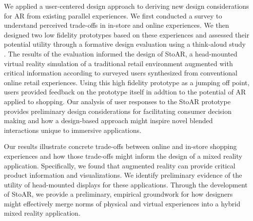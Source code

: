We applied  a user-centered design approach to deriving new design considerations for AR from existing parallel experiences. We first conducted a survey to understand perceived trade-offs in in-store and online experiences.  We then designed two low fidelity prototypes based on these experiences and assessed their potential utility through a formative design evaluation using a think-aloud study . The results of the evaluation informed the design of StoAR, a head-mounted virtual reality simulation of a traditional retail environment augmented with critical information according to surveyed users synthesized from conventional online retail experiences. Using this high fidelity prototype as a jumping off point, users provided feedback on the prototype itself in addtion to the potential of AR applied to shopping. Our analysis of user responses to the StoAR prototype provides preliminary design considerations for facilitating consumer decision making and how a design-based approach might inspire novel blended interactions unique to immersive applications.

Our results illustrate concrete trade-offs between online and in-store shopping experiences and how those trade-offs might inform the design of a mixed reality application. Specifically, we found that augmented reality can provide critical product information and visualizations. We identify preliminary evidence of the utility of head-mounted displays for these applications. Through the development of StoAR, we provide a preliminary, empirical groundwork for how designers might effectively merge norms of physical and virtual experiences into a hybrid mixed reality application.



